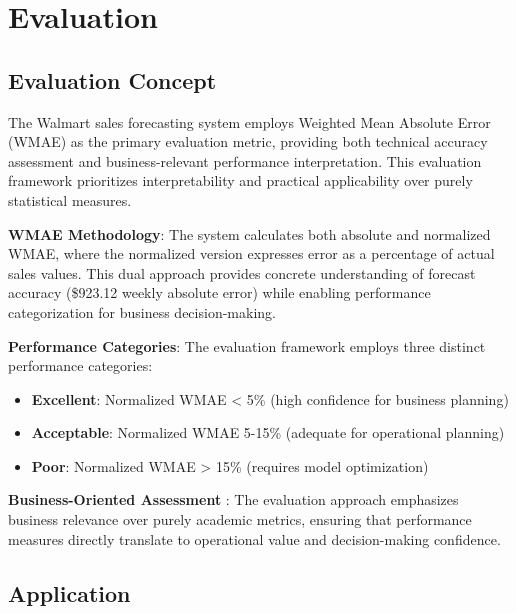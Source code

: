 %
%
%


\chapter{Evaluation}

\section{Evaluation Concept}

The Walmart sales forecasting system employs Weighted Mean Absolute Error (WMAE) as the primary evaluation metric, providing both technical accuracy assessment and business-relevant performance interpretation. This evaluation framework prioritizes interpretability and practical applicability over purely statistical measures.

\textbf{WMAE Methodology}: The system calculates both absolute and normalized WMAE, where the normalized version expresses error as a percentage of actual sales values. This dual approach provides concrete understanding of forecast accuracy (\$923.12 weekly absolute error) while enabling performance categorization for business decision-making.

\textbf{Performance Categories}: The evaluation framework employs three distinct performance categories:
\begin{itemize}
	\item \textbf{Excellent}: Normalized WMAE < 5\% (high confidence for business planning)
	\item \textbf{Acceptable}: Normalized WMAE 5-15\% (adequate for operational planning)  
	\item \textbf{Poor}: Normalized WMAE > 15\% (requires model optimization)
\end{itemize}

\textbf{Business-Oriented Assessment }: The evaluation approach emphasizes business relevance over purely academic metrics, ensuring that performance measures directly translate to operational value and decision-making confidence.

\section{Application}

